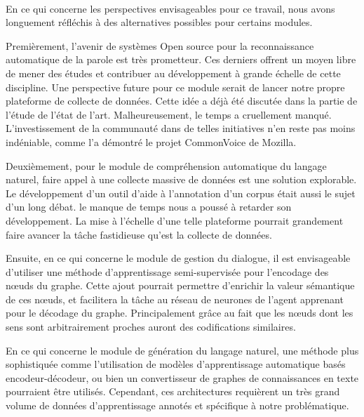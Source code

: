 \paragraph{}
En ce qui concerne les perspectives envisageables pour ce travail, nous avons longuement réfléchis à des alternatives possibles pour certains modules.
\par
Premièrement, l'avenir de systèmes Open source pour la reconnaissance automatique de la parole est très prometteur. Ces derniers offrent un moyen libre de mener des études et contribuer au développement à grande échelle de cette discipline. Une perspective future pour ce module serait de lancer notre propre plateforme de collecte de données. Cette idée a déjà été discutée dans la partie de l'étude de l'état de l'art. Malheureusement, le temps a cruellement manqué. L'investissement de la communauté dans de telles initiatives n'en reste pas moins indéniable, comme l'a démontré le projet CommonVoice de Mozilla.
\par
Deuxièmement, pour le module de compréhension automatique du langage naturel, faire appel à une collecte massive de données est une solution explorable. Le développement d'un outil d'aide à l'annotation d'un corpus était aussi le sujet d'un long débat. le manque de temps nous a poussé à retarder son développement. La mise à l'échelle d'une telle plateforme pourrait grandement faire avancer la tâche fastidieuse qu'est la collecte de données. 
\par 

Ensuite, en ce qui concerne le module de gestion du dialogue, il est envisageable d'utiliser une méthode d'apprentissage semi-supervisée pour l'encodage des n\oe{}uds du graphe. Cette ajout pourrait permettre d'enrichir la valeur sémantique de ces n\oe{}uds, et facilitera la tâche au réseau de neurones de l'agent apprenant pour le décodage du graphe. Principalement grâce au fait que les n\oe{}uds dont les sens sont arbitrairement proches auront des codifications similaires.

\par
En ce qui concerne le module de génération du langage naturel, une méthode plus sophistiquée comme l'utilisation de modèles d'apprentissage automatique basés encodeur-décodeur, ou bien un convertisseur de graphes de connaissances en texte pourraient être utilisés. Cependant, ces architectures requièrent un très grand volume de données d'apprentissage annotés et spécifique à notre problématique.

